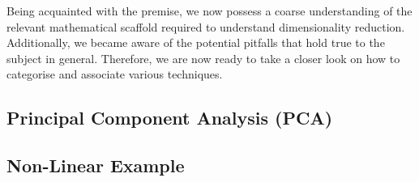 Being acquainted with the premise, we now possess a coarse understanding of the relevant mathematical scaffold required to understand dimensionality reduction.
Additionally, we became aware of the potential pitfalls that hold true to the subject in general.
Therefore, we are now ready to take a closer look on how to categorise and associate various techniques.




\subsection{Principal Component Analysis (PCA)}


\clearpage




\subsection{Non-Linear Example}

\clearpage

